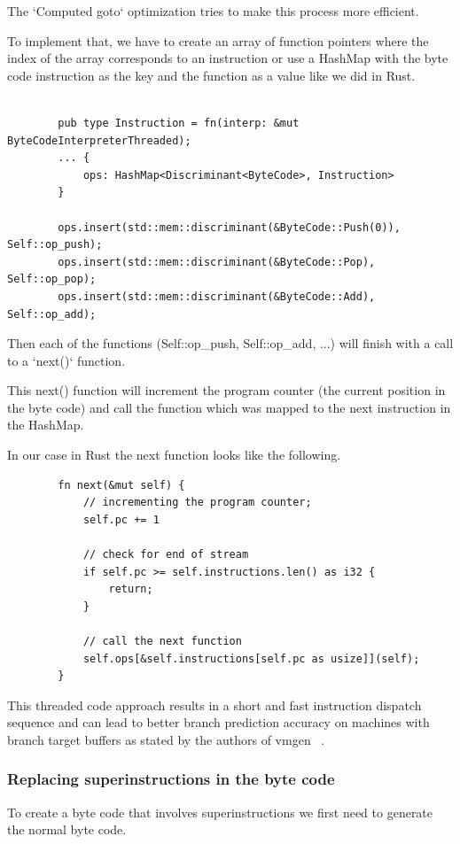 \documentclass{article}
\begin{document}
\begin{enumerate}
        The `Computed goto` optimization tries to make this process more efficient.

        To implement that, we have to create an array of function pointers where
        the index of the array corresponds to an instruction or use a HashMap
        with the byte code instruction as the key and the function as a value
        like we did in Rust.

        \begin{verbatim}

        pub type Instruction = fn(interp: &mut ByteCodeInterpreterThreaded);
        ... {
            ops: HashMap<Discriminant<ByteCode>, Instruction>
        }

        ops.insert(std::mem::discriminant(&ByteCode::Push(0)), Self::op_push);
        ops.insert(std::mem::discriminant(&ByteCode::Pop), Self::op_pop);
        ops.insert(std::mem::discriminant(&ByteCode::Add), Self::op_add);
        \end{verbatim}

        Then each of the functions (Self::op\_push, Self::op\_add, ...) will finish
        with a call to a `next()` function.

        This next() function will increment the program counter (the current
        position in the byte code) and call the function which was mapped to
        the next instruction in the HashMap.

        In our case in Rust the next function looks like the following.

        \begin{verbatim}
        fn next(&mut self) {
            // incrementing the program counter;
            self.pc += 1 

            // check for end of stream
            if self.pc >= self.instructions.len() as i32 {
                return; 
            }

            // call the next function
            self.ops[&self.instructions[self.pc as usize]](self);
        }
        \end{verbatim}

        This threaded code approach results in a short and fast instruction
        dispatch sequence and can lead to better branch prediction accuracy on
        machines with branch target buffers as stated by the authors of vmgen ~\cite{vmgen}.

\end{enumerate}

\subsubsection{Replacing superinstructions in the byte code}
\label{sec:replacing_superinstructions}
To create a byte code that involves superinstructions we first need to generate
the normal byte code.
\end{document}
